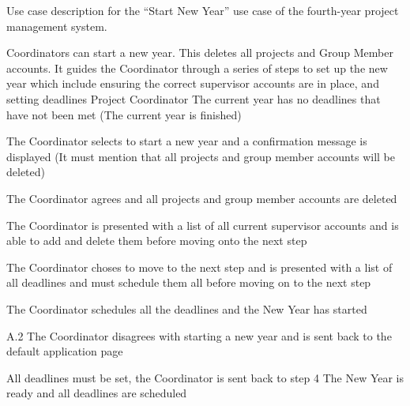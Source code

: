 \begin{table}
  \centering
  \caption{Use case description for the ``Start New Year'' use case of the fourth-year project management system.}
  \label{tbl:use-case-start-new-year}

  \begin{usecase}
    Coordinators can start a new year. This deletes all projects and Group Member accounts. It guides the Coordinator through a series of steps to set up the new year which include ensuring the correct supervisor accounts are in place, and setting deadlines
    Project Coordinator
    The current year has no deadlines that have not been met (The current year is finished)
    \ucnormal
    \begin{ucenum}
      \item The Coordinator selects to start a new year and a confirmation message is displayed (It must mention that all projects and group member accounts will be deleted)
      \item The Coordinator agrees and all projects and group member accounts are deleted
      \item The Coordinator is presented with a list of all current supervisor accounts and is able to add and delete them before moving onto the next step
      \item The Coordinator choses to move to the next step and is presented with a list of all deadlines and must schedule them all before moving on to the next step
      \item The Coordinator schedules all the deadlines and the New Year has started
    \end{ucenum}
    \begin{ucenum*}
      \item [A.2] The Coordinator disagrees with starting a new year and is sent back to the default application page
    \end{ucenum*}
    All deadlines must be set, the Coordinator is sent back to step 4
    The New Year is ready and all deadlines are scheduled
  \end{usecase}
\end{table}



